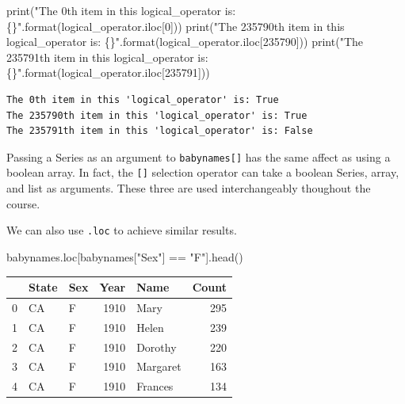 \documentclass[
  letterpaper,
  DIV=11,
  numbers=noendperiod]{scrreprt}
\newenvironment{Shaded}{\begin{snugshade}}{\end{snugshade}}
\newcommand{\BuiltInTok}[1]{\textcolor[rgb]{0.00,0.23,0.31}{#1}}
\newcommand{\DecValTok}[1]{\textcolor[rgb]{0.68,0.00,0.00}{#1}}
\newcommand{\NormalTok}[1]{\textcolor[rgb]{0.00,0.23,0.31}{#1}}
\newcommand{\OperatorTok}[1]{\textcolor[rgb]{0.37,0.37,0.37}{#1}}
\newcommand{\SpecialCharTok}[1]{\textcolor[rgb]{0.37,0.37,0.37}{#1}}
\newcommand{\StringTok}[1]{\textcolor[rgb]{0.13,0.47,0.30}{#1}}
\begin{document}
\begin{Shaded}
\begin{Highlighting}[]
\BuiltInTok{print}\NormalTok{(}\StringTok{"The 0th item in this \textquotesingle{}logical\_operator\textquotesingle{} is: }\SpecialCharTok{\{\}}\StringTok{"}\NormalTok{.}\BuiltInTok{format}\NormalTok{(logical\_operator.iloc[}\DecValTok{0}\NormalTok{]))}
\BuiltInTok{print}\NormalTok{(}\StringTok{"The 235790th item in this \textquotesingle{}logical\_operator\textquotesingle{} is: }\SpecialCharTok{\{\}}\StringTok{"}\NormalTok{.}\BuiltInTok{format}\NormalTok{(logical\_operator.iloc[}\DecValTok{235790}\NormalTok{]))}
\BuiltInTok{print}\NormalTok{(}\StringTok{"The 235791th item in this \textquotesingle{}logical\_operator\textquotesingle{} is: }\SpecialCharTok{\{\}}\StringTok{"}\NormalTok{.}\BuiltInTok{format}\NormalTok{(logical\_operator.iloc[}\DecValTok{235791}\NormalTok{]))}
\end{Highlighting}
\end{Shaded}

\begin{verbatim}
The 0th item in this 'logical_operator' is: True
The 235790th item in this 'logical_operator' is: True
The 235791th item in this 'logical_operator' is: False
\end{verbatim}

Passing a Series as an argument to \texttt{babynames{[}{]}} has the same
affect as using a boolean array. In fact, the \texttt{{[}{]}} selection
operator can take a boolean Series, array, and list as arguments. These
three are used interchangeably thoughout the course.

We can also use \texttt{.loc} to achieve similar results.

\begin{Shaded}
\begin{Highlighting}[]
\NormalTok{babynames.loc[babynames[}\StringTok{"Sex"}\NormalTok{] }\OperatorTok{==} \StringTok{"F"}\NormalTok{].head()}
\end{Highlighting}
\end{Shaded}

\begin{tabular}{lllrlr}
\toprule
{} & State & Sex &  Year &      Name &  Count \\
\midrule
0 &    CA &   F &  1910 &      Mary &    295 \\
1 &    CA &   F &  1910 &     Helen &    239 \\
2 &    CA &   F &  1910 &   Dorothy &    220 \\
3 &    CA &   F &  1910 &  Margaret &    163 \\
4 &    CA &   F &  1910 &   Frances &    134 \\
\bottomrule
\end{tabular}
\end{document}
